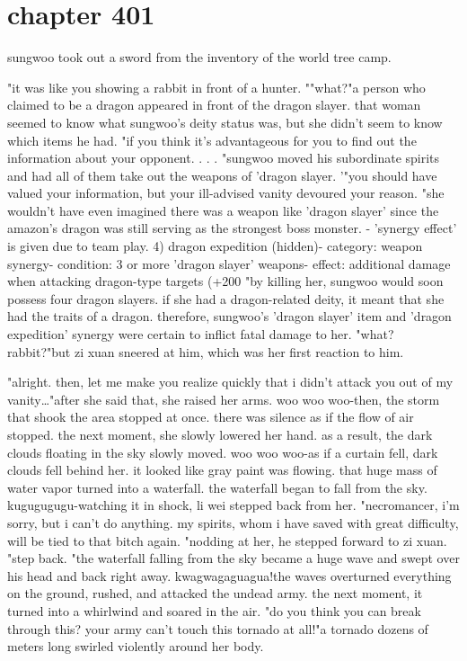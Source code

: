 \section{chapter 401}

sungwoo took out a sword from the inventory of the world tree camp.





"it was like you showing a rabbit in front of a hunter.
""what?"a person who claimed to be a dragon appeared in front of the dragon slayer.
that woman seemed to know what sungwoo's deity status was, but she didn't seem to know which items he had.
"if you think it's advantageous for you to find out the information about your opponent.
.
.
.
"sungwoo moved his subordinate spirits and had all of them take out the weapons of 'dragon slayer.
'"you should have valued your information, but your ill-advised vanity devoured your reason.
"she wouldn't have even imagined there was a weapon like 'dragon slayer' since the amazon's dragon was still serving as the strongest boss monster.
- 'synergy effect' is given due to team play.
 4) dragon expedition (hidden)- category: weapon synergy- condition: 3 or more 'dragon slayer' weapons- effect: additional damage when attacking dragon-type targets (+200%
"by killing her, sungwoo would soon possess four dragon slayers.
if she had a dragon-related deity, it meant that she had the traits of a dragon.
therefore, sungwoo's 'dragon slayer' item and 'dragon expedition' synergy were certain to inflict fatal damage to her.
"what? rabbit?"but zi xuan sneered at him, which was her first reaction to him.

"alright.
 then, let me make you realize quickly that i didn't attack you out of my vanity…"after she said that, she raised her arms.
woo woo woo-then, the storm that shook the area stopped at once.
 there was silence as if the flow of air stopped.
 the next moment, she slowly lowered her hand.
 as a result, the dark clouds floating in the sky slowly moved.
woo woo woo-as if a curtain fell, dark clouds fell behind her.
 it looked like gray paint was flowing.
that huge mass of water vapor turned into a waterfall.
 the waterfall began to fall from the sky.
kugugugugu-watching it in shock, li wei stepped back from her.
"necromancer, i'm sorry, but i can't do anything.
 my spirits, whom i have saved with great difficulty, will be tied to that bitch again.
"nodding at her, he stepped forward to zi xuan.
 "step back.
"the waterfall falling from the sky became a huge wave and swept over his head and back right away.
 kwagwagaguagua!the waves overturned everything on the ground, rushed, and attacked the undead army.
 the next moment, it turned into a whirlwind and soared in the air.
 "do you think you can break through this? your army can't touch this tornado at all!"a tornado dozens of meters long swirled violently around her body.
 
